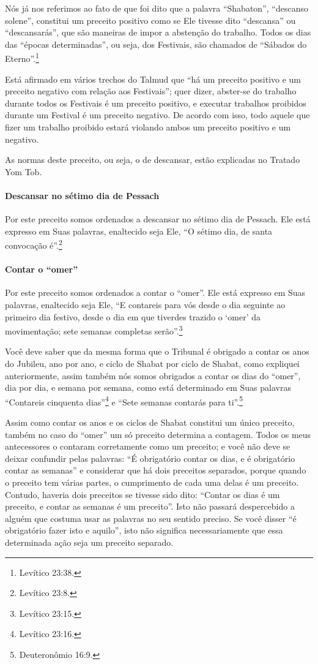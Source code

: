 Nós já nos referimos ao fato de que foi dito que a palavra
``Shabaton'', ``descanso solene'', constitui um preceito positivo como
se Ele tivesse dito ``descansa'' ou ``descansarás'', que são maneiras de
impor a abstenção do trabalho. Todos os dias das ``épocas
determinadas'', ou seja, dos Festivais, são chamados de ``Sábados do
Eterno''.\footnote{Levítico 23:38.}

Está afirmado em vários trechos do Talmud que ``há um preceito positivo
e um preceito negativo com relação aos Festivais''; quer dizer,
abster-se do trabalho durante todos os Festivais é um preceito positivo,
e executar trabalhos proibidos durante um Festival é um preceito
negativo. De acordo com isso, todo aquele que fizer um trabalho
proibido estará violando ambos um preceito positivo e um negativo.

As normas deste preceito, ou seja, o de descansar, estão explicadas no
Tratado Yom Tob.

\paragraph{Descansar no sétimo dia de Pessach}

Por este preceito somos ordenados a descansar no sétimo dia de
Pessach. Ele está expresso em Suas palavras, enaltecido seja Ele,
``O sétimo dia, de santa convocação é''.\footnote{Levítico 23:8.}

\paragraph{Contar o ``omer''}

Por este preceito somos ordenados a contar o ``omer''. Ele está
expresso em Suas palavras, enaltecido seja Ele, ``E contareis para vós
desde o dia seguinte ao primeiro dia festivo, desde o dia em que
tiverdes trazido o `omer' da movimentação; sete semanas completas
serão''.\footnote{Levítico 23:15.}

Você deve saber que da mesma forma que o Tribunal é obrigado a contar os
anos do Jubileu, ano por ano, e ciclo de Shabat por ciclo de Shabat,
como expliquei anteriormente, assim também nós somos obrigados a contar
os dias do ``omer'', dia por dia, e semana por semana, como está
determinado em Suas palavras ``Contareis cinquenta dias''\footnote{Levítico
23:16.} e ``Sete semanas contarás para ti''.\footnote{Deuteronômio 16:9.}

Assim como contar os anos e os ciclos de Shabat constitui um único
preceito, também no caso do ``omer'' um só preceito determina a
contagem. Todos os meus antecessores o contaram corretamente como um
preceito; e você não deve se deixar confundir pelas palavras: ``É
obrigatório contar os dias, e é obrigatório contar as semanas'' e
considerar que há dois preceitos separados, porque quando o preceito tem
várias partes, o cumprimento de cada uma delas é um preceito. Contudo,
haveria dois preceitos se tivesse sido dito: ``Contar os dias é um
preceito, e contar as semanas é um preceito''. Isto não passará
despercebido a alguém que costuma usar as palavras no seu sentido
preciso. Se você disser ``é obrigatório fazer isto e aquilo'', isto não
significa necessariamente que essa determinada ação seja um preceito
separado.


